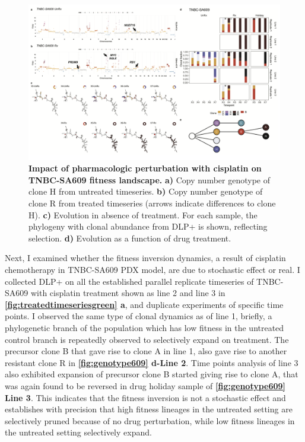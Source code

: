\begin{figure}
\centering
\includegraphics[width=\textwidth]{Figures/chap4/genePlotSA609.png}
	
\caption[Impact of pharmacologic perturbation with cisplatin on TNBC-SA609 fitness landscape]
	{\small
	\textbf{Impact of pharmacologic perturbation with cisplatin on TNBC-SA609 fitness landscape.}
	 \textbf{a)} Copy number genotype of clone H from untreated timeseries. \textbf{b)} Copy number genotype of clone R from treated timeseries (arrows indicate differences to clone H). \textbf{c)}  Evolution in absence of treatment. For each sample, the phylogeny with clonal abundance from DLP+ is shown, reflecting selection. \textbf{d)} Evolution as a function of drug treatment.}
\label{fig:genotype609}
\end{figure}



Next, I examined whether the fitness inversion dynamics, a result of cisplatin chemotherapy in TNBC-SA609 PDX model, are due to stochastic effect or real.
I collected DLP+ on all the established parallel replicate timeseries of TNBC-SA609 with cisplatin treatment shown as line 2 and line 3 in \textbf{\autoref{fig:treatedtimeseriesgreen} a}, and duplicate experiments of specific time points. I observed the same type of clonal dynamics as of line 1, briefly, a phylogenetic branch of the population which has low fitness in the untreated control branch is repeatedly observed to selectively expand on treatment. The precursor clone B that gave rise to clone A in line 1, also gave rise to another resistant clone R in \textbf{\autoref{fig:genotype609} d-Line 2}. Time points analysis of line 3 also exhibited expansion of precursor clone B started giving rise to clone A, that was again found to be reversed in drug holiday sample of \textbf{\autoref{fig:genotype609} Line 3}. This indicates that the fitness inversion is not a stochastic effect and establishes with precision that high fitness lineages in the untreated setting are selectively pruned because of no drug perturbation, while low fitness lineages in the untreated setting selectively expand.

